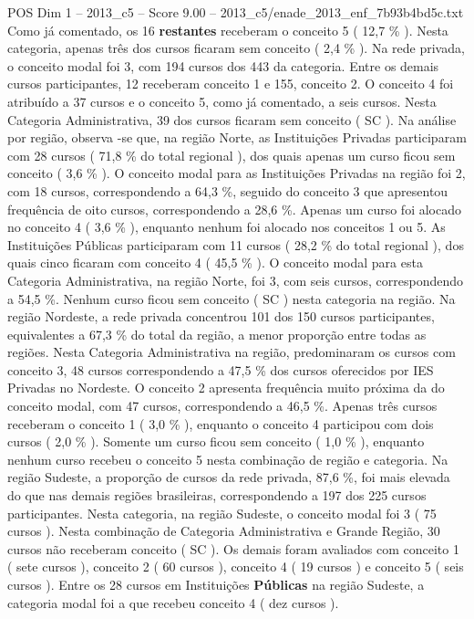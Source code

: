 \begin{textsample}{POS Dim 1 – 2013\_c5 – Score 9.00 – 2013\_c5/enade\_2013\_enf\_7b93b4bd5c.txt}
Como já comentado, os 16 \textbf{restantes} receberam o conceito 5 ( 12,7 \% ).
Nesta categoria, apenas três dos cursos ficaram sem conceito ( 2,4 \% ).
Na rede privada, o conceito modal foi 3, com 194 cursos dos 443 da categoria.
Entre os demais cursos participantes, 12 receberam conceito 1 e 155, conceito 2.
O conceito 4 foi atribuído a 37 cursos e o conceito 5, como já comentado, a seis cursos.
Nesta Categoria Administrativa, 39 dos cursos ficaram sem conceito ( SC ).
Na análise por região, observa -se que, na região Norte, as Instituições Privadas participaram com 28 cursos ( 71,8 \% do total regional ), dos quais apenas um curso ficou sem conceito ( 3,6 \% ).
O conceito modal para as Instituições Privadas na região foi 2, com 18 cursos, correspondendo a 64,3 \%, seguido do conceito 3 que apresentou frequência de oito cursos, correspondendo a 28,6 \%.
Apenas um curso foi alocado no conceito 4 ( 3,6 \% ), enquanto nenhum foi alocado nos conceitos 1 ou 5.
As Instituições Públicas participaram com 11 cursos ( 28,2 \% do total regional ), dos quais cinco ficaram com conceito 4 ( 45,5 \% ).
O conceito modal para esta Categoria Administrativa, na região Norte, foi 3, com seis cursos, correspondendo a 54,5 \%.
Nenhum curso ficou sem conceito ( SC ) nesta categoria na região.
Na região Nordeste, a rede privada concentrou 101 dos 150 cursos participantes, equivalentes a 67,3 \% do total da região, a menor proporção entre todas as regiões.
Nesta Categoria Administrativa na região, predominaram os cursos com conceito 3, 48 cursos correspondendo a 47,5 \% dos cursos oferecidos por IES Privadas no Nordeste.
O conceito 2 apresenta frequência muito próxima da do conceito modal, com 47 cursos, correspondendo a 46,5 \%.
Apenas três cursos receberam o conceito 1 ( 3,0 \% ), enquanto o conceito 4 participou com dois cursos ( 2,0 \% ).
Somente um curso ficou sem conceito ( 1,0 \% ), enquanto nenhum curso recebeu o conceito 5 nesta combinação de região e categoria.
Na região Sudeste, a proporção de cursos da rede privada, 87,6 \%, foi mais elevada do que nas demais regiões brasileiras, correspondendo a 197 dos 225 cursos participantes.
Nesta categoria, na região Sudeste, o conceito modal foi 3 ( 75 cursos ).
Nesta combinação de Categoria Administrativa e Grande Região, 30 cursos não receberam conceito ( SC ).
Os demais foram avaliados com conceito 1 ( sete cursos ), conceito 2 ( 60 cursos ), conceito 4 ( 19 cursos ) e conceito 5 ( seis cursos ).
Entre os 28 cursos em Instituições \textbf{Públicas} na região Sudeste, a categoria modal foi a que recebeu conceito 4 ( dez cursos ).

\end{textsample}
